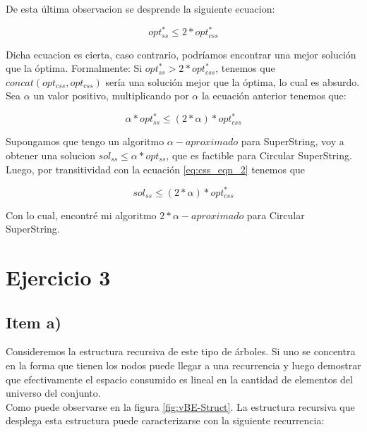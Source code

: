\documentclass[10pt,a4paper]{article}
\begin{document}
De esta última observacion se desprende la siguiente ecuacion:

\begin{equation}
    \label{eq:css_eqn_1}
    opt_{ss}^* \leq 2*opt_{css}^*
\end{equation}

Dicha ecuacion es cierta, caso contrario, podríamos encontrar una mejor solución que la óptima. Formalmente: Si $opt_{ss}^* > 2*opt_{css}^*$, tenemos que $concat(opt_{css}, opt_{css})$ sería una solución mejor que la óptima, lo cual es absurdo.\\

Sea $\alpha$ un valor positivo, multiplicando por $\alpha$ la ecuación anterior tenemos que:

\begin{equation}
    \label{eq:css_eqn_2}
    \alpha * opt_{ss}^* \leq (2*\alpha)*opt_{css}^*
\end{equation}

Supongamos que tengo un algoritmo $\alpha-aproximado$ para SuperString, voy a obtener una solucion $sol_{ss} \leq \alpha * opt_{ss}$, que es factible para Circular SuperString. Luego, por transitividad con la ecuación \ref{eq:css_eqn_2} tenemos que

\begin{equation}
    \label{eq:css_eqn_3}
    sol_{ss} \leq (2*\alpha)*opt_{css}^*
\end{equation}

Con lo cual, encontré mi algoritmo $2*\alpha-aproximado$ para Circular SuperString.

\section{Ejercicio 3}
\subsection{Item a)}
Consideremos la estructura recursiva de este tipo de árboles. Si uno se concentra en la forma que tienen los nodos puede llegar a una recurrencia y luego demostrar que efectivamente el espacio consumido es lineal en la cantidad de elementos del universo del conjunto.\\

Como puede observarse en la figura \ref{fig:vBE-Struct}. La estructura recursiva que desplega esta estructura puede caracterizarse con la siguiente recurrencia:\\
\end{document}
